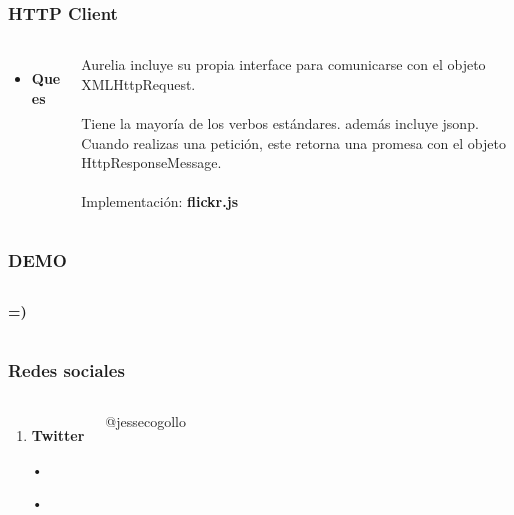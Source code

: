 \documentclass{beamer}
\begin{document}
\begin{frame}
\frametitle{HTTP Client}
\begin{columns}[c]
\begin{itemize}
\item \textbf{Que es}
\end{itemize}
Aurelia incluye su propia interface para comunicarse con el objeto XMLHttpRequest.
\\~\\
Tiene la mayor\'ia de los verbos est\'andares. adem\'as incluye jsonp.
Cuando realizas una petici\'on, este retorna una promesa con el objeto HttpResponseMessage.
\\~\\
Implementaci\'on: \textbf{flickr.js}
\end{columns}
\end{frame}
\begin{frame}
\frametitle{DEMO}
\begin{columns}[c]
\textbf{=)}
\end{columns}
\end{frame}
\begin{frame}
\frametitle{Redes sociales}
\begin{columns}[c]
\begin{enumerate}
\item \textbf{Twitter}
\item[•]
\item[•]
\end{enumerate}
{\color{blue}@jessecogollo}
\end{columns}
\end{frame}
\end{document}
